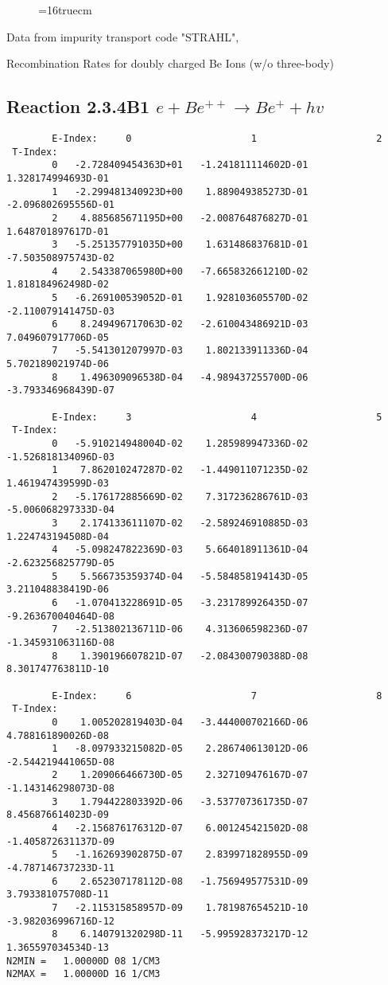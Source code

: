 \documentclass[12pt,dvipdfmx]{article}
\begin{document}
\begin{figure} \label{2.3.4B0}
\epsfxsize=16truecm
\end{figure}
\newpage
Data from impurity transport code "STRAHL", \cite{kn:Behringer}

  Recombination Rates for doubly charged Be Ions (w/o three-body)
\subsection{
Reaction 2.3.4B1  $e + Be^{++} \rightarrow Be^+ + hv$
}

\begin{small}\begin{verbatim}
        E-Index:     0                     1                     2
 T-Index:
        0   -2.728409454363D+01   -1.241811114602D-01    1.328174994693D-01
        1   -2.299481340923D+00    1.889049385273D-01   -2.096802695556D-01
        2    4.885685671195D+00   -2.008764876827D-01    1.648701897617D-01
        3   -5.251357791035D+00    1.631486837681D-01   -7.503508975743D-02
        4    2.543387065980D+00   -7.665832661210D-02    1.818184962498D-02
        5   -6.269100539052D-01    1.928103605570D-02   -2.110079141475D-03
        6    8.249496717063D-02   -2.610043486921D-03    7.049607917706D-05
        7   -5.541301207997D-03    1.802133911336D-04    5.702189021974D-06
        8    1.496309096538D-04   -4.989437255700D-06   -3.793346968439D-07

        E-Index:     3                     4                     5
 T-Index:
        0   -5.910214948004D-02    1.285989947336D-02   -1.526818134096D-03
        1    7.862010247287D-02   -1.449011071235D-02    1.461947439599D-03
        2   -5.176172885669D-02    7.317236286761D-03   -5.006068297333D-04
        3    2.174133611107D-02   -2.589246910885D-03    1.224743194508D-04
        4   -5.098247822369D-03    5.664018911361D-04   -2.623256825779D-05
        5    5.566735359374D-04   -5.584858194143D-05    3.211048838419D-06
        6   -1.070413228691D-05   -3.231789926435D-07   -9.263670040464D-08
        7   -2.513802136711D-06    4.313606598236D-07   -1.345931063116D-08
        8    1.390196607821D-07   -2.084300790388D-08    8.301747763811D-10

        E-Index:     6                     7                     8
 T-Index:
        0    1.005202819403D-04   -3.444000702166D-06    4.788161890026D-08
        1   -8.097933215082D-05    2.286740613012D-06   -2.544219441065D-08
        2    1.209066466730D-05    2.327109476167D-07   -1.143146298073D-08
        3    1.794422803392D-06   -3.537707361735D-07    8.456876614023D-09
        4   -2.156876176312D-07    6.001245421502D-08   -1.405872631137D-09
        5   -1.162693902875D-07    2.839971828955D-09   -4.787146737233D-11
        6    2.652307178112D-08   -1.756949577531D-09    3.793381075708D-11
        7   -2.115315858957D-09    1.781987654521D-10   -3.982036996716D-12
        8    6.140791320298D-11   -5.995928373217D-12    1.365597034534D-13
N2MIN =   1.00000D 08 1/CM3
N2MAX =   1.00000D 16 1/CM3


\end{verbatim}
\end{small}
\end{document}
